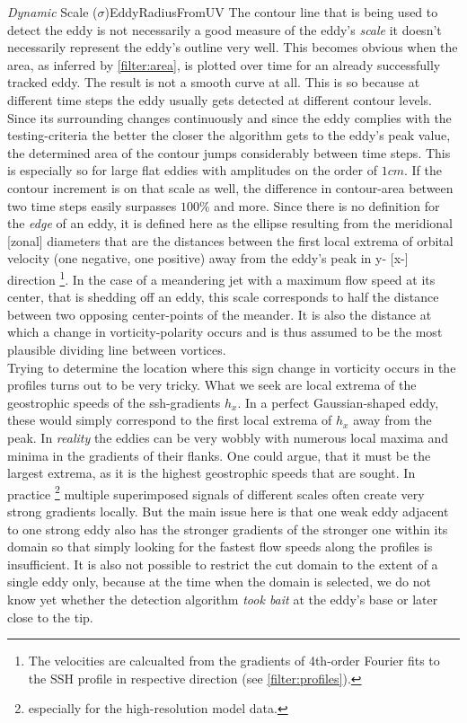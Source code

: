 \begin{filter}{\textit{Dynamic} Scale ($\sigma$)}{EddyRadiusFromUV}
 \label{filter:dynscale}
The contour line that is being used to detect the eddy is not
necessarily a good measure of the eddy's \textit{scale} \ie it doesn't
necessarily represent the eddy's outline very well. This becomes
obvious when the area, as inferred by \cref{filter:area}, is plotted over time
for an already successfully tracked eddy. The result is not a smooth curve at
all. This is so because at different time steps the eddy usually gets detected
at different contour levels. Since its surrounding changes continuously and
since the eddy complies with the testing-criteria the better the closer the
algorithm gets to the eddy's peak value, the determined area of the contour
jumps considerably between time steps. This is especially so for large flat
eddies with amplitudes on the order of $1cm$. If the contour increment is on
that scale as well, the difference in contour-area between two time steps
easily surpasses $100\%$ and more.
Since there is no definition for the \textit{edge} of an eddy, it is defined here as the ellipse resulting from the meridional [zonal] diameters that
are the distances between the first local extrema of orbital velocity (one negative, one positive) away from
the eddy's peak in y- [x-] direction \footnote{The velocities are calcualted from the gradients of 4th-order Fourier fits to the SSH profile in respective direction (see \cref{filter:profiles}).}.
In the case of a meandering jet with a maximum flow speed at its center, that
is shedding off an eddy, this scale corresponds to half the distance between
two opposing center-points of the meander. It is also the distance at which a
change in vorticity-polarity occurs and is thus assumed to be the most plausible
dividing line between vortices. \\
Trying to determine the location where this sign change in vorticity occurs in the profiles turns out to be very tricky. What we seek are local extrema of the geostrophic speeds \ie of the ssh-gradients $h_x$. In a perfect Gaussian-shaped eddy, these would simply correspond to the first local extrema of $h_x$ away from the peak. In \textit{reality} the eddies can be very wobbly with numerous local maxima and minima in the gradients of their flanks. One could argue, that it must be the largest extrema, as it is the highest geostrophic speeds that are sought. In practice \footnote{especially for the high-resolution model data.} multiple superimposed signals of different scales often create very strong gradients locally. But the main issue here is that one weak eddy adjacent to one strong eddy also has the stronger gradients of the stronger one within its domain so that simply looking for the fastest flow speeds along the profiles is insufficient. It is also not possible to restrict the cut domain to the extent of a single eddy only, because at the time when the domain is selected, we do not know yet whether the detection algorithm \textit{took bait} at the eddy's base or later close to the tip. \\

\end{filter}
